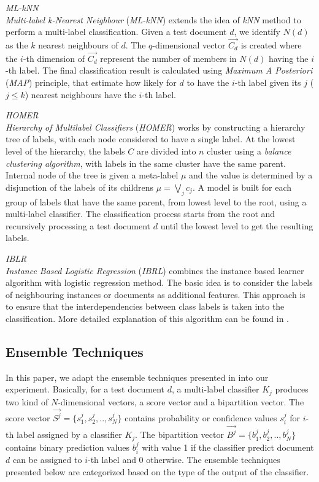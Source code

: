 \emph{ML-kNN}\\
\emph{Multi-label k-Nearest Neighbour} (\emph{ML-kNN}) extends the idea of \emph{kNN} method to perform a multi-label classification. Given a test document $d$, we identify $N(d)$ as the $k$ nearest neighbours of $d$. The $q$-dimensional vector $\vec{C_{d}}$ is created where the $i$-th dimension of $\vec{C_{d}}$ represent the number of members in $N(d)$ having the $i$-th label. The final classification result is calculated using \emph{Maximum A Posteriori} (\emph{MAP}) principle, that estimate how likely for $d$ to have the $i$-th label given its $j$ ($j\le k$) nearest neighbours have the $i$-th label.

\emph{HOMER}\\
\emph{Hierarchy of Multilabel Classifiers} (\emph{HOMER}) works by constructing a hierarchy tree of labels, with each node considered to have a single label. At the lowest level of the hierarchy, the labels $C$ are divided into $n$ cluster using a \emph{balance clustering algorithm}, with labels in the same cluster have the same parent. Internal node of the tree is given a meta-label $\mu$ and the value is determined by a disjunction of the labels of its childrens $\mu = \bigvee\limits_{j}{}c_{j}$. A model is built for each group of labels that have the same parent, from lowest level to the root, using a multi-label classifier. The classification process starts from the root and recursively processing a test document $d$ until the lowest level to get the resulting labels.

\emph{IBLR}\\
\emph{Instance Based Logistic Regression} (\emph{IBRL}) combines the instance based learner algorithm with logistic regression method. The basic idea is to consider the labels of neighbouring instances or documents as additional features. This approach is to ensure that the interdependencies between class labels is taken into the classification. More detailed explanation of this algorithm can be found in \cite{IBLR}.


\subsection{Ensemble Techniques}
In this paper, we adapt the ensemble techniques presented in \cite{sanden2011enhancing} into our experiment. Basically, for a test document $d$, a multi-label classifier $K_{j}$ produces two kind of $N$-dimensional vectors, a score vector and a bipartition vector. The score vector $\vec{S^{j}} = \{s^{j}_{1}, s^{j}_{2},..,s^{j}_{N}\}$ contains probability or confidence values $s^{j}_{i}$ for $i$-th label assigned by a classifier $K_{j}$. The bipartition vector $\vec{B^{j}} = \{b^{j}_{1}, b^{j}_{2},..,b^{j}_{N}\}$ contains binary prediction values $b^{j}_{i}$ with value 1 if the classifier predict document $d$ can be assigned to $i$-th label and 0 otherwise. The ensemble techniques presented below are categorized based on the type of the output of the classifier.

